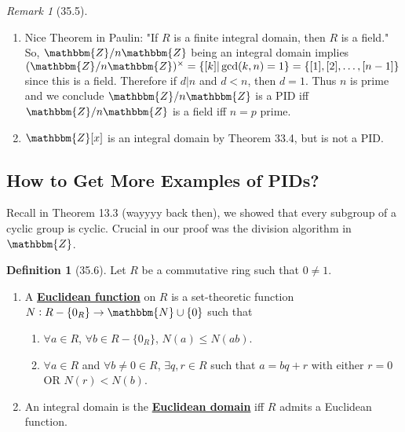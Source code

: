 \documentclass{article}
\newcommand{\N}{\mathbbm{N}}
\newcommand{\Z}{\mathbbm{Z}}
\newcommand{\union}{\cup}
\newcommand{\define}[1]{\textbf{\underline{#1}}}
\newcommand{\func}[3]{#1: #2 \to #3}
\theoremstyle{definition}
\newtheorem*{defn}{Definition}
\theoremstyle{remark}
\newtheorem*{rmk}{Remark}
\begin{document}
{        \begin{rmk}[35.5]
            \begin{enumerate}
                \item Nice Theorem in Paulin: "If $R$ is a finite integral domain, then $R$ is a field." So, $\Z/n\Z$ being an integral domain implies $(\Z/n\Z)^\times=\{[k]|\gcd(k,n)=1\}=\{[1],[2],\ldots,[n-1]\}$ since this is a field. Therefore if $d|n$ and $d<n$, then $d=1$. Thus $n$ is prime and we conclude $\Z/n\Z$ is a PID iff $\Z/n\Z$ is a field iff $n=p$ prime.
                \item $\Z[x]$ is an integral domain by Theorem 33.4, but is not a PID.
            \end{enumerate}
        \end{rmk}
        
        \subsection*{How to Get More Examples of PIDs?}{
            Recall in Theorem 13.3 (wayyyy back then), we showed that every subgroup of a cyclic group is cyclic. Crucial in our proof was the division algorithm in $\Z$.
            
            \begin{defn}[35.6]
                Let $R$ be a commutative ring such that $0\neq 1$.
                \begin{enumerate}
                    \item A \define{Euclidean function} on $R$ is a set-theoretic function $\func{N}{R-\{0_R\}}{\N\union \{0\}}$ such that
                    \begin{enumerate}
                        \item $\forall a\in R$, $\forall b\in R-\{0_R\}$, $N(a)\leq N(ab)$.
                        \item $\forall a \in R$ and $\forall b\neq 0\in R$, $\exists q,r\in R$ such that $a=bq+r$ with either $r=0$ OR $N(r)<N(b)$.
                    \end{enumerate}
                    \item An integral domain is the \define{Euclidean domain} iff $R$ admits a Euclidean function.
                \end{enumerate}
            \end{defn}
            
}}
\end{document}
